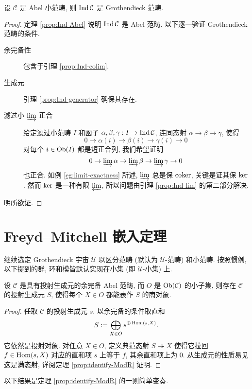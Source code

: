 \begin{theorem}\label{prop:Ind-Grothendieck}
	设 $\mathcal{C}$ 是 Abel 小范畴, 则 $\operatorname{Ind}\mathcal{C}$ 是 Grothendieck 范畴.
\end{theorem}
\begin{proof}
	定理 \ref{prop:Ind-Abel} 说明 $\operatorname{Ind}\mathcal{C}$ 是 Abel 范畴. 以下逐一验证 Grothendieck 范畴的条件.
	\begin{description}
		\item[余完备性] 包含于引理 \ref{prop:Ind-colim}.
		\item[生成元] 引理 \ref{prop:Ind-generator} 确保其存在.
		\item[滤过小 $\varinjlim$ 正合] 给定滤过小范畴 $I$ 和函子 $\alpha, \beta, \gamma: I \to \operatorname{Ind}\mathcal{C}$, 连同态射 $\alpha \to \beta \to \gamma$, 使得
		\[ 0 \to \alpha(i) \to \beta(i) \to \gamma(i) \to 0 \]
		对每个 $i \in \operatorname{Ob}(I)$ 都是短正合列, 我们希望证明
		\[ 0 \to \varinjlim \alpha \to \varinjlim \beta \to \varinjlim \gamma \to 0 \]
		也正合. 如例 \ref{eg:limit-exactness} 所述, $\varinjlim$ 总是保 $\operatorname{coker}$, 关键是证其保 $\operatorname{ker}$. 然而 $\operatorname{ker}$ 是一种有限 $\varprojlim$, 所以问题由引理 \ref{prop:Ind-lim} 的第二部分解决.
	\end{description}
	明所欲证.
\end{proof}

\section{Freyd--Mitchell 嵌入定理}\label{sec:FM}
继续选定 Grothendieck 宇宙 $\mathcal{U}$ 以区分范畴 (默认为 $\mathcal{U}$-范畴) 和小范畴. 按照惯例, 以下提到的群, 环和模皆默认实现在小集 (即 $\mathcal{U}$-小集) 上.

\begin{lemma}\label{prop:FM-prep-1}
	设 $\mathcal{C}$ 是具有投射生成元的余完备 Abel 范畴, 而 $O$ 是 $\operatorname{Ob}(\mathcal{C})$ 的小子集, 则存在 $\mathcal{C}$ 的投射生成元 $S$, 使得每个 $X \in O$ 都能表作 $S$ 的商对象.
\end{lemma}
\begin{proof}
	任取 $\mathcal{C}$ 的投射生成元 $s$. 以余完备的条件取直和
	\[ S := \bigoplus_{X \in O} s^{\oplus \operatorname{Hom}(s, X)}. \]
	它依然是投射对象. 对任意 $X \in O$, 定义典范态射 $S \twoheadrightarrow X$ 使得它拉回 $f \in \operatorname{Hom}(s, X)$ 对应的直和项 $s$ 上等于 $f$, 其余直和项上为 $0$. 从生成元的性质易见这是满态射, 详阅定理 \ref{prop:identify-ModR} 证明.
\end{proof}

以下结果是定理 \ref{prop:identify-ModR} 的一则简单变奏.

